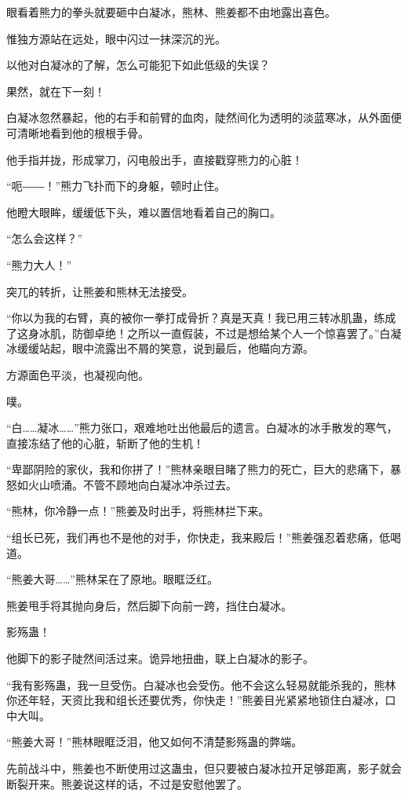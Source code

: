 
\begin{this_body}

眼看着熊力的拳头就要砸中白凝冰，熊林、熊姜都不由地露出喜色。

惟独方源站在远处，眼中闪过一抹深沉的光。

以他对白凝冰的了解，怎么可能犯下如此低级的失误？

果然，就在下一刻！

白凝冰忽然暴起，他的右手和前臂的血肉，陡然间化为透明的淡蓝寒冰，从外面便可清晰地看到他的根根手骨。

他手指并拢，形成掌刀，闪电般出手，直接戳穿熊力的心脏！

“呃――！”熊力飞扑而下的身躯，顿时止住。

他瞪大眼眸，缓缓低下头，难以置信地看着自己的胸口。

“怎么会这样？”

“熊力大人！”

突兀的转折，让熊姜和熊林无法接受。

“你以为我的右臂，真的被你一拳打成骨折？真是天真！我已用三转冰肌蛊，练成了这身冰肌，防御卓绝！之所以一直假装，不过是想给某个人一个惊喜罢了。”白凝冰缓缓站起，眼中流露出不屑的笑意，说到最后，他瞄向方源。

方源面色平淡，也凝视向他。

噗。

“白……凝冰……”熊力张口，艰难地吐出他最后的遗言。白凝冰的冰手散发的寒气，直接冻结了他的心脏，斩断了他的生机！

“卑鄙阴险的家伙，我和你拼了！”熊林亲眼目睹了熊力的死亡，巨大的悲痛下，暴怒如火山喷涌。不管不顾地向白凝冰冲杀过去。

“熊林，你冷静一点！”熊姜及时出手，将熊林拦下来。

“组长已死，我们再也不是他的对手，你快走，我来殿后！”熊姜强忍着悲痛，低喝道。

“熊姜大哥……”熊林呆在了原地。眼眶泛红。

熊姜甩手将其抛向身后，然后脚下向前一跨，挡住白凝冰。

影殇蛊！

他脚下的影子陡然间活过来。诡异地扭曲，联上白凝冰的影子。

“我有影殇蛊，我一旦受伤。白凝冰也会受伤。他不会这么轻易就能杀我的，熊林你还年轻，天资比我和组长还要优秀，你快走！”熊姜目光紧紧地锁住白凝冰，口中大叫。

“熊姜大哥！”熊林眼眶泛泪，他又如何不清楚影殇蛊的弊端。

先前战斗中，熊姜也不断使用过这蛊虫，但只要被白凝冰拉开足够距离，影子就会断裂开来。熊姜说这样的话，不过是安慰他罢了。


\end{this_body}
